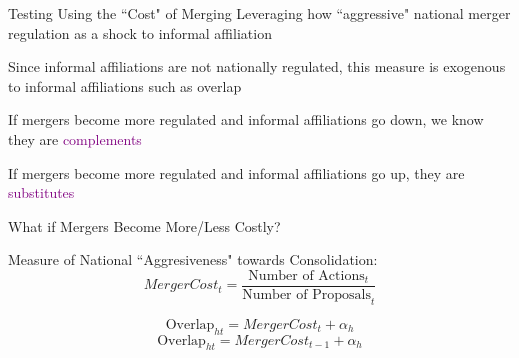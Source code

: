 \documentclass[notes,11pt, aspectratio=169]{beamer}
\newenvironment{wideitemize}{\itemize\addtolength{\itemsep}{10pt}}{\enditemize}
\begin{document}

\begin{frame}{Testing Using the ``Cost" of Merging}
    Leveraging how ``aggressive" national merger regulation as a shock to informal affiliation

    \vspace{3mm}
    \begin{wideitemize}
        \item Since informal affiliations are not nationally regulated, this measure is exogenous to informal affiliations such as overlap
        \item If mergers become more regulated and informal affiliations go down, we know they are \textcolor{purple}{complements}
        \item If mergers become more regulated and informal affiliations go up, they are \textcolor{purple}{substitutes}
    \end{wideitemize}
\end{frame}

\begin{frame}{What if Mergers Become More/Less Costly?}
    \begin{block}{Measure of National ``Aggresiveness" towards Consolidation:}
    \vspace{2mm}
        $$MergerCost_t = \frac{\text{Number of Actions}_t}{\text{Number of Proposals}_t}$$
        \vspace{2mm}
    \end{block}

    \vspace{8mm}

    $$\text{Overlap}_{ht} = MergerCost_t + \alpha_h $$
    $$\text{Overlap}_{ht} = MergerCost_{t-1} + \alpha_h $$
\end{frame}
\end{document}
